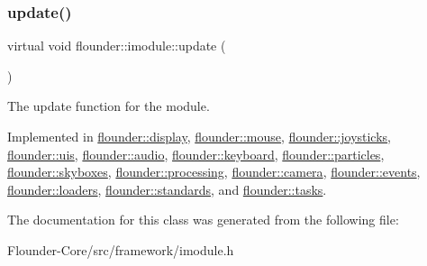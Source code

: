 \subsubsection{\texorpdfstring{update()}{update()}}
{\footnotesize\ttfamily virtual void flounder\+::imodule\+::update (\begin{DoxyParamCaption}{ }\end{DoxyParamCaption})\hspace{0.3cm}{\ttfamily [pure virtual]}}



The update function for the module. 



Implemented in \hyperlink{classflounder_1_1display_a799c6a76fcac1a0ca56dfd6b8d7993fa}{flounder\+::display}, \hyperlink{classflounder_1_1mouse_aa1b1d60e1d1cf4ec7d19eaef65e040bc}{flounder\+::mouse}, \hyperlink{classflounder_1_1joysticks_a346fc03cae7164d6eb927333d1ae725f}{flounder\+::joysticks}, \hyperlink{classflounder_1_1uis_a234b52f70d1819932752a03168f21e10}{flounder\+::uis}, \hyperlink{classflounder_1_1audio_aabff6a1996b8571404023b6ac17009b6}{flounder\+::audio}, \hyperlink{classflounder_1_1keyboard_a9fe79eabe905466fd90413d2c3b68841}{flounder\+::keyboard}, \hyperlink{classflounder_1_1particles_a12f1dd9883cc49987f6ff0ca3105bdb6}{flounder\+::particles}, \hyperlink{classflounder_1_1skyboxes_ae94e675bcda78f2af0298a8551b82aa6}{flounder\+::skyboxes}, \hyperlink{classflounder_1_1processing_ac096299eb1b5b67739586900710d4206}{flounder\+::processing}, \hyperlink{classflounder_1_1camera_a6b2da3a1c348764d3cf954db5ac5b357}{flounder\+::camera}, \hyperlink{classflounder_1_1events_a7fc08fdb5dc615a924dd0d55996747dc}{flounder\+::events}, \hyperlink{classflounder_1_1loaders_a9becf522a74f35f7e3dc7839577ba736}{flounder\+::loaders}, \hyperlink{classflounder_1_1standards_a681e682db67c10abb814cf0f8daf086a}{flounder\+::standards}, and \hyperlink{classflounder_1_1tasks_a32e51c65b63e8c98097d5d40c1912e5c}{flounder\+::tasks}.



The documentation for this class was generated from the following file\+:\begin{DoxyCompactItemize}
\item 
Flounder-\/\+Core/src/framework/imodule.\+h\end{DoxyCompactItemize}
